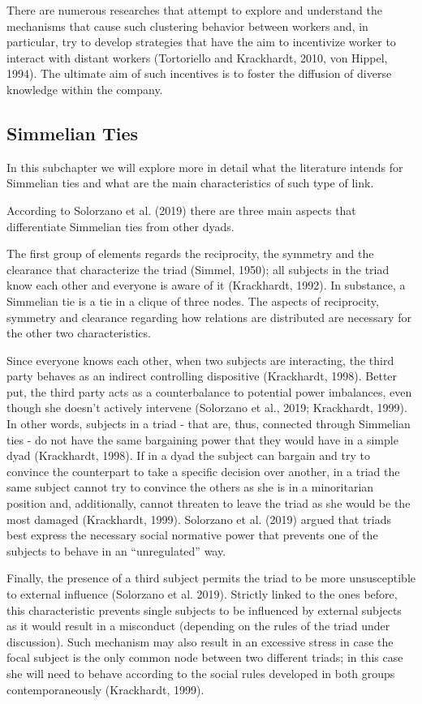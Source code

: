 \documentclass{article}
\begin{document}
There are numerous researches that attempt to explore and understand the mechanisms that cause such clustering behavior between workers and, in particular, try to develop strategies that have the aim to incentivize worker to interact with distant workers (Tortoriello and Krackhardt, 2010, von Hippel, 1994). The ultimate aim of such incentives is to foster the diffusion of diverse knowledge within the company. 


\subsection{Simmelian Ties}
In this subchapter we will explore more in detail what the literature intends for Simmelian ties and what are the main characteristics of such type of link.

According to Solorzano et al. (2019) there are three main aspects that differentiate Simmelian ties from other dyads.

The first group of elements regards the reciprocity, the symmetry and the clearance that characterize the triad (Simmel, 1950); all subjects in the triad know each other and everyone is aware of it (Krackhardt, 1992). In substance, a Simmelian tie is a tie in a clique of three nodes. The aspects of reciprocity, symmetry and clearance regarding how relations are distributed are necessary for the other two characteristics.

Since everyone knows each other, when two subjects are interacting, the third party behaves as an indirect controlling dispositive (Krackhardt, 1998). Better put, the third party acts as a counterbalance to potential power imbalances, even though she doesn’t actively intervene (Solorzano et al., 2019; Krackhardt, 1999). In other words, subjects in a triad - that are, thus, connected through Simmelian ties - do not have the same bargaining power that they would have in a simple dyad (Krackhardt, 1998). If in a dyad the subject can bargain and try to convince the counterpart to take a specific decision over another, in a triad the same subject cannot try to convince the others as she is in a minoritarian position and, additionally, cannot threaten to leave the triad as she would be the most damaged (Krackhardt, 1999). Solorzano et al. (2019) argued that triads best express the necessary social normative power that prevents one of the subjects to behave in an “unregulated” way.

Finally, the presence of a third subject permits the triad to be more unsusceptible to external influence (Solorzano et al. 2019). Strictly linked to the ones before, this characteristic prevents single subjects to be influenced by external subjects as it would result in a misconduct (depending on the rules of the triad under discussion). Such mechanism may also result in an excessive stress in case the focal subject is the only common node between two different triads; in this case she will need to behave according to the social rules developed in both groups contemporaneously (Krackhardt, 1999). 
\end{document}
